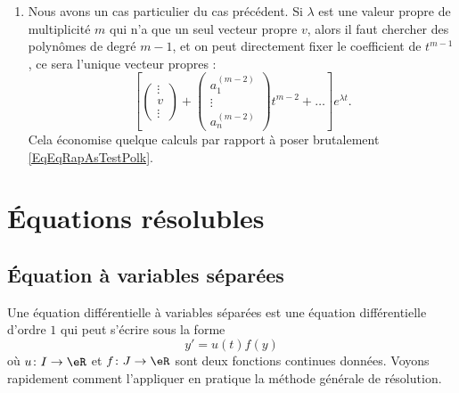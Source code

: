 \begin{enumerate}
\item\label{ItemRapSystDe}
Nous avons un cas particulier du cas précédent. Si $\lambda$ est une valeur propre de multiplicité $m$ qui n'a que un seul vecteur propre $v$, alors il faut chercher des polynômes de degré $m-1$, et on peut directement fixer le coefficient de $t^{m-1}$, ce sera l'unique vecteur propres :
\begin{equation}
\left[
	\begin{pmatrix}
	\vdots	\\ 
	v	\\ 
	\vdots	
\end{pmatrix}+
\begin{pmatrix}
	a_1^{(m-2)}	\\ 
	\vdots	\\ 
	a_n^{(m-2)}	
\end{pmatrix}t^{m-2}+\ldots
\right] e^{\lambda t}.
\end{equation}
Cela économise quelque calculs par rapport à poser brutalement \eqref{EqEqRapAsTestPolk}.

\end{enumerate}
\let\theenumi\oldTheEnumi

					\section{Équations résolubles}

\subsection{Équation à variables séparées}
\label{secvarsep}


Une équation différentielle à variables séparées est une équation différentielle d'ordre $1$ qui peut s'écrire sous la forme
\begin{equation}		\label{EqGeneTheSep}
	y'=u(t)f(y)
\end{equation}
où $u\colon I\to \eR$ et $f\colon J\to \eR$ sont deux fonctions continues données. Voyons rapidement comment l'appliquer en pratique la méthode générale de résolution. 

